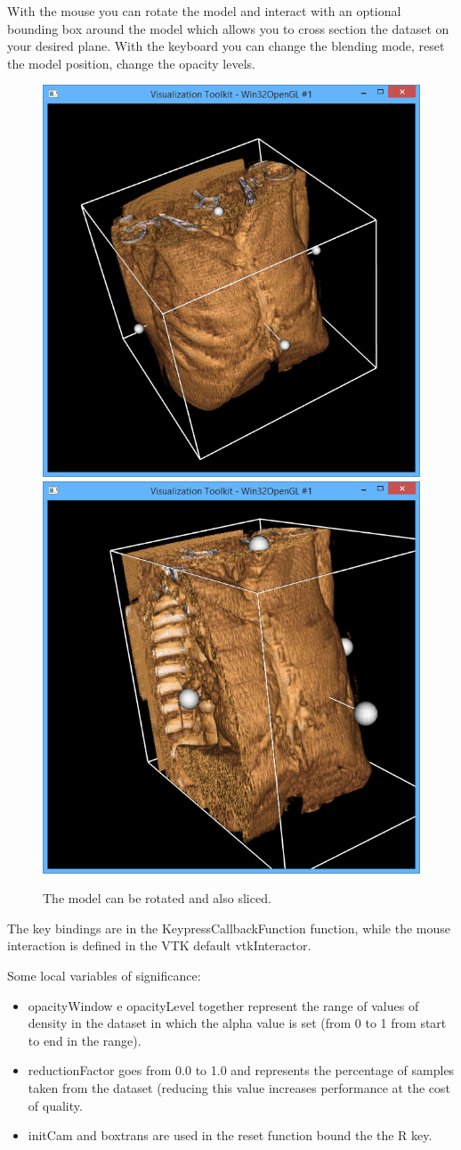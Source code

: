 \documentclass[11pt]{article} %
\begin{document}
With the mouse you can rotate the model and interact with an optional bounding box around the model which allows you to cross section the dataset on your desired plane.
With the keyboard you can change the blending mode, reset the model position, change the opacity levels.

\begin{figure}[h!]

\includegraphics[width=0.4\linewidth]{img/smartvolumetricdemo_blending.PNG}
  \includegraphics[width=0.4\linewidth]{img/smartvolumetricdemo_crosssection.PNG}
  \caption{The model can be rotated and also sliced.}


\end{figure}

The key bindings are in the KeypressCallbackFunction function, while the mouse interaction is defined in the VTK default  vtkInteractor.

Some local variables of significance:
\begin{itemize}
\item opacityWindow e opacityLevel together represent the range of values of density in the dataset in which the alpha value is set (from 0 to 1 from start to end in the range).
\item reductionFactor goes from 0.0 to 1.0 and represents the percentage of samples taken from the dataset (reducing this value increases performance at the cost of quality.
\item initCam and boxtrans are used in the reset function bound the the R key.
\end{itemize}
\end{document}
